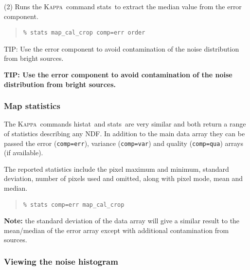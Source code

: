 \documentclass[twoside,11pt]{article}
\newenvironment{latexonly}{}{}
\newcommand{\xref}[3]{#1}
\renewcommand{\_}{\texttt{\symbol{95}}}
\newenvironment{fmpage}[1]{\begin{lrbox}{\fmbox}\begin{minipage}{#1}}{\end{minipage}\end{lrbox}\fbox{\usebox{\fmbox}}}
\newenvironment{myquote}{\begin{quote}\begin{small}}{\end{small}\end{quote}}
\newcommand{\Kappa}{\xref{\textsc{Kappa}}{sun95}{}}
\newcommand{\task}[1]{\textsf{#1}}
\newcommand{\histat}{\xref{\task{histat}}{sun95}{HISTAT}}
\newcommand{\stats}{\xref{\task{stats}}{sun95}{STATS}}
\begin{document}
(2) Runs the \Kappa\ command \stats\ to extract the median value from
the error component.
\begin{myquote}
\begin{verbatim}
% stats map_cal_crop comp=err order
\end{verbatim}
\end{myquote}

\begin{latexonly}
\begin{center}
\begin{fmpage}{0.95\linewidth}
\vspace{0.1cm}
TIP: Use the error component to avoid contamination of the noise
distribution from bright sources.

\vspace{0.1cm}
\end{fmpage}
\end{center}
\end{latexonly}

\begin{htmlonly}
\textbf{TIP: Use the error component to avoid contamination of the noise
distribution from bright sources.}
\end{htmlonly}


\subsubsection{Map statistics}

The \Kappa\ commands \histat\ and \stats\ are very similar and both
return a range of statistics describing any NDF. In addition to the
main data array they can be passed the error (\texttt{comp=err}), variance
(\texttt{comp=var}) and quality (\texttt{comp=qua}) arrays (if available).

The reported statistics include the pixel maximum and minimum,
standard deviation, number of pixels used and omitted, along with
pixel mode, mean and median.
\begin{myquote}
\begin{verbatim}
% stats comp=err map_cal_crop
\end{verbatim}
\end{myquote}

\textbf{Note:} the standard deviation of the data array will give a
similar result to the mean/median of the error array except with
additional contamination from sources.

\subsubsection{Viewing the noise histogram}
\end{document}
